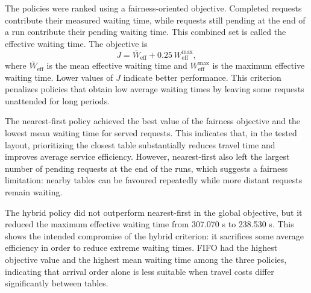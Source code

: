 \documentclass[conference]{IEEEtran}
\begin{document}
The policies were ranked using a fairness-oriented objective. Completed
requests contribute their measured waiting time, while requests still pending
at the end of a run contribute their pending waiting time. This combined set is
called the effective waiting time. The objective is
\begin{equation}
J = \overline{W}_{\mathrm{eff}} + 0.25\,W_{\mathrm{eff}}^{\max},
\end{equation}
where $\overline{W}_{\mathrm{eff}}$ is the mean effective waiting time and
$W_{\mathrm{eff}}^{\max}$ is the maximum effective waiting time. Lower values
of $J$ indicate better performance. This criterion penalizes policies that
obtain low average waiting times by leaving some requests unattended for long
periods.

\begin{table}[htbp]
\caption{Request-selection policy comparison in the incremental mapping mode.}
\label{tab:policy_comparison}
\centering
{}
\end{table}

The nearest-first policy achieved the best value of the fairness objective and
the lowest mean waiting time for served requests. This indicates that, in the
tested layout, prioritizing the closest table substantially reduces travel
time and improves average service efficiency. However, nearest-first also left
the largest number of pending requests at the end of the runs, which suggests
a fairness limitation: nearby tables can be favoured repeatedly while more
distant requests remain waiting.

The hybrid policy did not outperform nearest-first in the global objective, but
it reduced the maximum effective waiting time from 307.070 s to 238.530 s.
This shows the intended compromise of the hybrid criterion: it sacrifices some
average efficiency in order to reduce extreme waiting times. FIFO had the
highest objective value and the highest mean waiting time among the three
policies, indicating that arrival order alone is less suitable when travel
costs differ significantly between tables.
\end{document}
